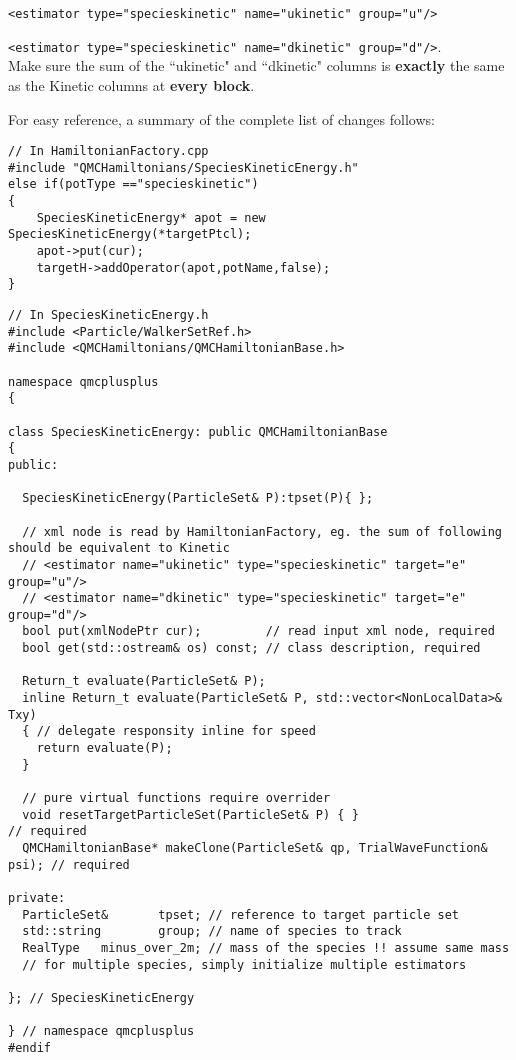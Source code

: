 \verb|<estimator type="specieskinetic" name="ukinetic" group="u"/>|

\verb|<estimator type="specieskinetic" name="dkinetic" group="d"/>|\:.\\

Make sure the sum of the ``ukinetic" and ``dkinetic" columns is \textbf{exactly} the same as the Kinetic columns at \textbf{every block}.

For easy reference, a summary of the complete list of changes follows:
\begin{lstlisting}[style=C++]
// In HamiltonianFactory.cpp
#include "QMCHamiltonians/SpeciesKineticEnergy.h"
else if(potType =="specieskinetic")
{
	SpeciesKineticEnergy* apot = new SpeciesKineticEnergy(*targetPtcl);
	apot->put(cur);
	targetH->addOperator(apot,potName,false);
}
\end{lstlisting}
\begin{lstlisting}[style=C++]
// In SpeciesKineticEnergy.h
#include <Particle/WalkerSetRef.h>
#include <QMCHamiltonians/QMCHamiltonianBase.h>

namespace qmcplusplus
{

class SpeciesKineticEnergy: public QMCHamiltonianBase
{
public:

  SpeciesKineticEnergy(ParticleSet& P):tpset(P){ };

  // xml node is read by HamiltonianFactory, eg. the sum of following should be equivalent to Kinetic
  // <estimator name="ukinetic" type="specieskinetic" target="e" group="u"/>
  // <estimator name="dkinetic" type="specieskinetic" target="e" group="d"/>
  bool put(xmlNodePtr cur);         // read input xml node, required
  bool get(std::ostream& os) const; // class description, required
  
  Return_t evaluate(ParticleSet& P);
  inline Return_t evaluate(ParticleSet& P, std::vector<NonLocalData>& Txy)
  { // delegate responsity inline for speed
    return evaluate(P);
  } 
  
  // pure virtual functions require overrider
  void resetTargetParticleSet(ParticleSet& P) { }                         // required
  QMCHamiltonianBase* makeClone(ParticleSet& qp, TrialWaveFunction& psi); // required
  
private:
  ParticleSet&       tpset; // reference to target particle set
  std::string        group; // name of species to track
  RealType   minus_over_2m; // mass of the species !! assume same mass
  // for multiple species, simply initialize multiple estimators
  
}; // SpeciesKineticEnergy

} // namespace qmcplusplus
#endif
\end{lstlisting}
